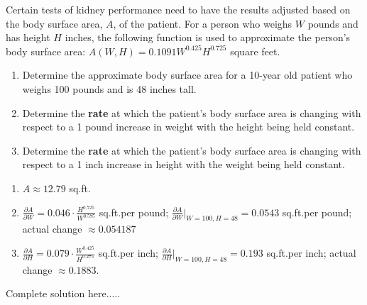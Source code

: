 \newpage
\begin{example}
Certain tests of kidney performance need to have the results adjusted based on the body surface area, $A$, of the patient.  For a person who weighs $W$ pounds and has height $H$ inches, the following function is used to approximate the person’s body surface area: $A(W,H)=0.1091W^{0.425}H^{0.725}$ square feet.   
\renewcommand{\labelenumi}{\textbf{(\alph{enumi})}}
\begin{enumerate}[leftmargin=*]
    \item Determine the approximate body surface area for a 10-year old patient who weighs 100 pounds and is 48 inches tall.                                                  
    \item Determine the \textbf{rate} at which the patient’s body surface area is changing with respect to a 1 pound increase in weight with the height being held constant.   
    \item Determine the \textbf{rate} at which the patient’s body surface area is changing with respect to a 1 inch increase in height with the weight being held constant.    
    \end{enumerate}
    \begin{sol}
    \renewcommand{\labelenumi}{\textbf{(\alph{enumi})}}
    \begin{enumerate}[leftmargin=*]
    \item $A\approx 12.79$ sq.ft.
    \item $\displaystyle \frac{\partial A}{\partial W}=0.046\cdot \frac{H^{0.725}}{W^{0.575}}$ sq.ft.per pound; $\displaystyle \frac{\partial A}{\partial W}\Big|_{W=100,H=48}=0.0543$ sq.ft.per pound; actual change $\approx 0.054187$
    \item $\displaystyle \frac{\partial A}{\partial H}=0.079\cdot \frac{W^{0.425}}{H^{0.275}}$ sq.ft.per inch; $\displaystyle \frac{\partial A}{\partial H}\Big|_{W=100,H=48}=0.193$ sq.ft.per inch; actual change $\approx 0.1883$.
    \end{enumerate}
    \end{sol}
    \begin{solL}
    Complete solution here.....
    
    \end{solL}
    
\end{example}

